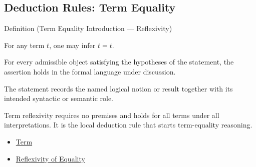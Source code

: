
\subsection{Deduction Rules: Term Equality}


\begin{definitionbox}{Definition (Term Equality Introduction --- Reflexivity)}
\begin{definition}\label{def:eq-refl}
For any term $t$, one may infer $t = t$.
\end{definition}
\end{definitionbox}
\begin{remark*}
For every admissible object satisfying the hypotheses of the statement, the
assertion holds in the formal language under discussion.
\end{remark*}

\begin{remark*}[Interpretation]
The statement records the named logical notion or result together with its
intended syntactic or semantic role.
\end{remark*}


\begin{remark*}[Exposition]
Term reflexivity requires no premises and holds for all terms under all
interpretations. It is the local deduction rule that starts term-equality
reasoning.
\end{remark*}

\begin{dependencies}
\begin{itemize}
  \item \hyperref[def:term]{Term}
  \item \hyperref[ax:axiomatic-equality-reflexivity]{Reflexivity of Equality}
\end{itemize}
\end{dependencies}

